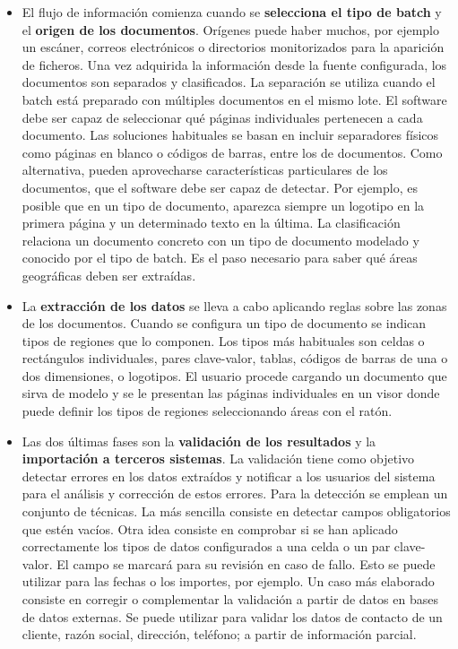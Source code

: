 \begin{itemize}
    \item El flujo de información comienza cuando se \textbf{selecciona el tipo de batch} y el \textbf{origen de los documentos}. Orígenes puede haber muchos, por ejemplo un escáner, correos electrónicos o directorios monitorizados para la aparición de ficheros. Una vez adquirida la información desde la fuente configurada, los documentos son separados y clasificados. La separación se utiliza cuando el batch está preparado con múltiples documentos en el mismo lote. El software debe ser capaz de seleccionar qué páginas individuales pertenecen a cada documento. Las soluciones habituales se basan en incluir separadores físicos como páginas en blanco o códigos de barras, entre los de documentos. Como alternativa, pueden aprovecharse características particulares de los documentos, que el software debe ser capaz de detectar. Por ejemplo, es posible que en un tipo de documento, aparezca siempre un logotipo en la primera página y un determinado texto en la última. La clasificación relaciona un documento concreto con un tipo de documento modelado y conocido por el tipo de batch. Es el paso necesario para saber qué áreas geográficas deben ser extraídas.
    
    \item La \textbf{extracción de los datos} se lleva a cabo aplicando reglas sobre las zonas de los documentos. Cuando se configura un tipo de documento se indican tipos de regiones que lo componen. Los tipos más habituales son celdas o rectángulos individuales, pares clave-valor, tablas, códigos de barras de una o dos dimensiones, o logotipos. El usuario procede cargando un documento que sirva de modelo y se le presentan las páginas individuales en un visor donde puede definir los tipos de regiones seleccionando áreas con el ratón.
    
    \item Las dos últimas fases son la \textbf{validación de los resultados} y la \textbf{importación a terceros sistemas}. La validación tiene como objetivo detectar errores en los datos extraídos y notificar a los usuarios del sistema para el análisis y corrección de estos errores. Para la detección se emplean un conjunto de técnicas. La más sencilla consiste en detectar campos obligatorios que estén vacíos. Otra idea consiste en comprobar si se han aplicado correctamente los tipos de datos configurados a una celda o un par clave-valor. El campo se marcará para su revisión en caso de fallo. Esto se puede utilizar para las fechas o los importes, por ejemplo. Un caso más elaborado consiste en corregir o complementar la validación a partir de datos en bases de datos externas. Se puede utilizar para validar los datos de contacto de un cliente, razón social, dirección, teléfono; a partir de información parcial.
    

\end{itemize}
